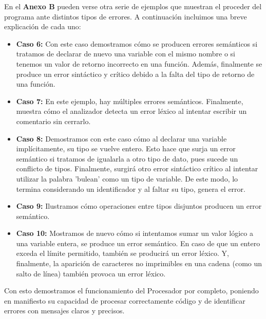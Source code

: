 \documentclass{article}
\begin{document}
En el \textbf{Anexo B} pueden verse otra serie de ejemplos que muestran el proceder del programa ante distintos tipos de errores. A continuación incluimos una breve explicación de cada uno:

\begin{itemize}
    \item \textbf{Caso 6:} Con este caso demostramos cómo se producen errores semánticos si tratamos de declarar de nuevo una variable con el mismo nombre o si tenemos un valor de retorno incorrecto en una función. Además, finalmente se produce un error sintáctico y crítico debido a la falta del tipo de retorno de una función.

    \item \textbf{Caso 7:} En este ejemplo, hay múltiples errores semánticos. Finalmente, muestra cómo el analizador detecta un error léxico al intentar escribir un comentario sin cerrarlo.
    
    \item \textbf{Caso 8:} Demostramos con este caso cómo al declarar una variable implícitamente, su tipo se vuelve entero. Esto hace que surja un error semántico si tratamos de igualarla a otro tipo de dato, pues sucede un conflicto de tipos. Finalmente, surgirá otro error sintáctico crítico al intentar utilizar la palabra 'bulean' como un tipo de variable. De este modo, lo termina considerando un identificador y al faltar su tipo, genera el error.

    \item \textbf{Caso 9:} Ilustramos cómo operaciones entre tipos disjuntos producen un error semántico.
    
    \item \textbf{Caso 10:} Mostramos de nuevo cómo si intentamos sumar un valor lógico a una variable entera, se produce un error semántico. En caso de que un entero exceda el límite permitido, también se producirá un error léxico. Y, finalmente, la aparición de caracteres no imprimibles en una cadena (como un salto de línea) también provoca un error léxico.
\end{itemize}

Con esto demostramos el funcionamiento del Procesador por completo, poniendo en manifiesto su capacidad de procesar correctamente código y de identificar errores con mensajes claros y precisos. 

\newpage

\newpage
\end{document}

